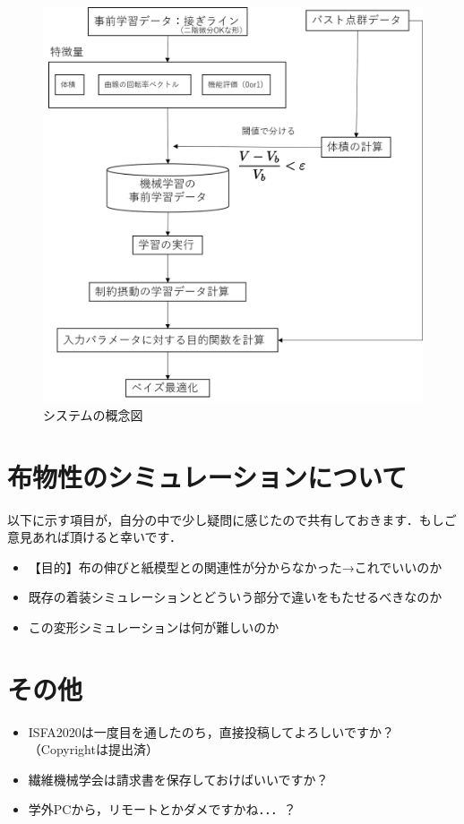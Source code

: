 \documentclass[11pt]{jsarticle}
\begin{document}
			\begin{figure}[h!]
				\centering
				\includegraphics[scale=0.45]{./Figure/OptFlow.png}
				\caption{システムの概念図}
			\end{figure}
	\section{布物性のシミュレーションについて}
		以下に示す項目が，自分の中で少し疑問に感じたので共有しておきます．もしご意見あれば頂けると幸いです．
		\begin{itemize}
			\item 【目的】布の伸びと紙模型との関連性が分からなかった→これでいいのか
			\item 既存の着装シミュレーションとどういう部分で違いをもたせるべきなのか
			\item この変形シミュレーションは何が難しいのか
		\end{itemize}
	\section{その他}
		\begin{itemize}
			\item ISFA2020は一度目を通したのち，直接投稿してよろしいですか？（Copyrightは提出済）
			\item 繊維機械学会は請求書を保存しておけばいいですか？
			\item 学外PCから，リモートとかダメですかね．．．？
		\end{itemize}
	
	
	\newpage
\vspace{10cm}

\vspace{14cm}
	\articleSPRfour
	\articleSPRfive
\end{document}
